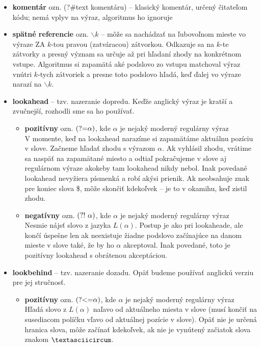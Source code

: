 \begin{itemize}
\item \textbf{komentár} ozn. (?\#text komentáru) -- klasický komentár, určený čitateľom kódu; nemá vplyv na výraz, algoritmus ho ignoruje
\item \textbf{spätné referencie} ozn. $\backslash k$ -- môže sa nachádzať na ľubovoľnom mieste vo výraze ZA $k$-tou pravou (zatváracou) zátvorkou. Odkazuje sa na $k$-te zátvorky a presný význam sa určuje až pri hľadaní zhody na konkrétnom vstupe. Algoritmus si zapamätá aké podslovo zo vstupu matchoval výraz vnútri $k$-tych zátvoriek a presne toto podslovo hľadá, keď ďalej vo výraze narazí na $\backslash k$.
\item \textbf{lookahead} -- tzv. nazeranie dopredu. Keďže anglický výraz je kratší a zvučnejší, rozhodli sme sa ho používať.
\begin{itemize}
\item \textbf{pozitívny} ozn. $\text{(?=}\alpha)$, kde $\alpha$ je nejaký moderný regulárny výraz 
\\ V momente, keď na lookahead narazíme si zapamätáme aktuálnu pozíciu v slove. Začneme hľadať zhodu s výrazom $\alpha$. Ak vyhlásil zhodu, vrátime sa naspäť na zapamätané miesto a odtiaľ pokračujeme v slove aj regulárnom výraze akokeby tam lookahead nikdy nebol. Inak povedané lookahead nevyžiera písmenká a robí akýsi prienik. Ak neobsahuje znak pre koniec slova \$, môže skončiť kdekoľvek -- je to v okamihu, keď zistil zhodu.
\item \textbf{negatívny} ozn. $\text{(?!~}\alpha)$, kde $\alpha$ je nejaký moderný regulárny výraz \\ Nesmie nájsť slovo z jazyka $L(\alpha)$. Postup je ako pri lookaheade, ale končí úspešne len ak neexistuje žiadne podslovo začínajúce na danom mieste v slove také, že by ho $\alpha$ akceptoval. Inak povedané, toto je pozitívny lookahead s obrátenou akceptáciou.
\end{itemize}
\item \textbf{lookbehind} -- tzv. nazeranie dozadu. Opäť budeme používať anglickú verziu pre jej stručnosť.
\begin{itemize}
\item \textbf{pozitívny} ozn. $\text{(?\textless =}\alpha)$, kde $\alpha$ je nejaký moderný regulárny výraz \\ Hľadá slovo z $L(\alpha)$ naľavo od aktuálneho miesta v slove (musí končiť na susediacom políčku vľavo od aktuálnej pozície v slove). Opäť nie je určená hranica slova, môže začínať kdekoľvek, ak nie je vynútený začiatok slova znakom $\textasciicircum$. 


\end{itemize}
\end{itemize}
